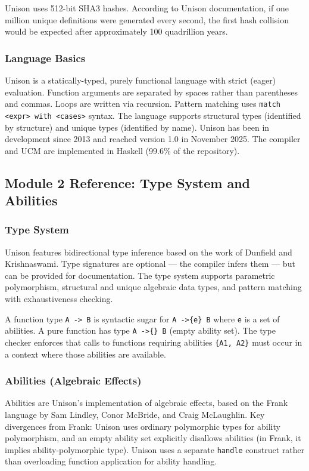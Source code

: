 \documentclass[11pt,letterpaper]{article}
\begin{document}
Unison uses 512-bit SHA3 hashes. According to Unison documentation, if one million unique definitions were generated every second, the first hash collision would be expected after approximately 100 quadrillion years.

\subsubsection{Language Basics}

Unison is a statically-typed, purely functional language with strict (eager) evaluation. Function arguments are separated by spaces rather than parentheses and commas. Loops are written via recursion. Pattern matching uses \texttt{match <expr> with <cases>} syntax. The language supports structural types (identified by structure) and unique types (identified by name). Unison has been in development since 2013 and reached version 1.0 in November 2025. The compiler and UCM are implemented in Haskell (99.6\% of the repository).

\subsection{Module 2 Reference: Type System and Abilities}

\subsubsection{Type System}

Unison features bidirectional type inference based on the work of Dunfield and Krishnaswami. Type signatures are optional --- the compiler infers them --- but can be provided for documentation. The type system supports parametric polymorphism, structural and unique algebraic data types, and pattern matching with exhaustiveness checking.

A function type \texttt{A -> B} is syntactic sugar for \texttt{A ->\{e\} B} where \texttt{e} is a set of abilities. A pure function has type \texttt{A ->\{\} B} (empty ability set). The type checker enforces that calls to functions requiring abilities \texttt{\{A1, A2\}} must occur in a context where those abilities are available.

\subsubsection{Abilities (Algebraic Effects)}

Abilities are Unison's implementation of algebraic effects, based on the Frank language by Sam Lindley, Conor McBride, and Craig McLaughlin. Key divergences from Frank: Unison uses ordinary polymorphic types for ability polymorphism, and an empty ability set explicitly disallows abilities (in Frank, it implies ability-polymorphic type). Unison uses a separate \texttt{handle} construct rather than overloading function application for ability handling.
\end{document}
